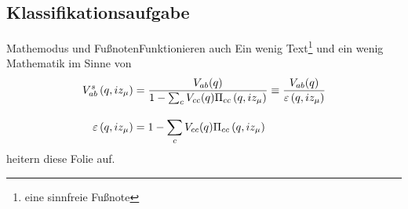 \documentclass[10pt]{beamer} %
\begin{document}
\subsection{Klassifikationsaufgabe}
\begin{frame}{Mathemodus und Fu{\ss}noten}{Funktionieren auch}
  Ein wenig Text\footnote{eine sinnfreie Fu{\ss}note} und ein wenig Mathematik im Sinne von
   \begin{align}
        V_{ab}^s\left(q, i z_\mu\right)
              &= \frac{V_{ab}(q)}{1-\sum_{c}V_{cc}(q)\Pi_{cc}\left(q, i z_\mu\right)} 
              \equiv \frac{V_{ab}(q)}{\varepsilon\left(q, i z_\mu\right)}  \\
          \rule{0pt}{2em}\varepsilon\left(q, iz_\mu\right) 
              &= 1-\sum_c V_{cc}(q)\Pi_{cc}\left(q, i z_\mu\right)
   \end{align}
   heitern diese Folie auf.
\end{frame}


\end{document}
